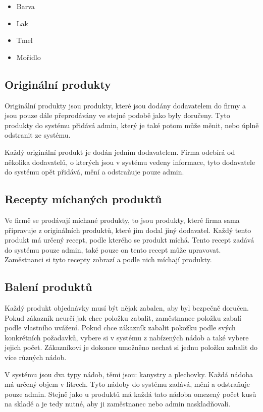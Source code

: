 \begin{itemize}
    \item{Barva} 
    \item{Lak} 
    \item{Tmel} 
    \item{Mořidlo} 
\end{itemize}



\subsection{Originální produkty}

Originální produkty jsou produkty, které jsou dodány dodavatelem do firmy a jsou pouze dále přeprodávány ve stejné podobě jako byly doručeny. Tyto produkty do systému přidává admin, který je také potom může měnit, nebo úplně odstranit ze systému. 

Každý originální produkt je dodán jedním dodavatelem. Firma odebírá od několika dodavatelů, o kterých jsou v systému vedeny informace, tyto dodavatele do systému opět přidává, mění a odstraňuje pouze admin. 

\subsection{Recepty míchaných produktů}

Ve firmě se prodávají míchané produkty, to jsou produkty, které firma sama připravuje z originálních produktů, které jim dodal jiný dodavatel. Každý tento produkt má určený recept, podle kterého se produkt míchá. Tento recept zadává do systému pouze admin, také pouze on tento recept může upravovat. Zaměstnanci si tyto recepty zobrazí a podle nich míchají produkty. 


\subsection{Balení produktů}

Každý produkt objednávky musí být nějak zabalen, aby byl bezpečně doručen. Pokud zákazník neurčí jak chce položku zabalit, zaměstnanec položku zabalí podle vlastního uvážení. Pokud chce zákazník zabalit pokožku podle svých konkrétních požadavků, vybere si v systému z nabízených nádob a také vybere jejich počet. Zákazníkovi je dokonce umožněno nechat si jednu položku zabalit do více různých nádob. 

V systému jsou dva typy nádob, těmi jsou: kanystry a plechovky. Každá nádoba má určený objem v litrech. Tyto nádoby do systému zadává, mění a odstraňuje pouze admin. Stejně jako u produktů má každá tato nádoba omezený počet kusů na skladě a je tedy nutné, aby ji zaměstnanec nebo admin naskladňovali. 



